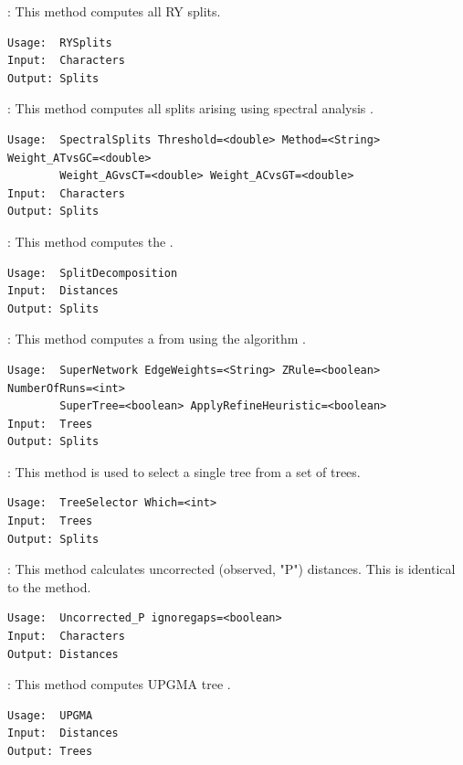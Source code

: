 \documentclass[11pt]{article}
\begin{document}
{}:
This method computes all RY splits.
\begin{verbatim}
Usage:  RYSplits
Input:  Characters
Output: Splits
\end{verbatim}

{}:
This method computes all splits arising using spectral analysis
\cite{HendyPenny93}.
\begin{verbatim}
Usage:  SpectralSplits Threshold=<double> Method=<String> Weight_ATvsGC=<double>
        Weight_AGvsCT=<double> Weight_ACvsGT=<double>
Input:  Characters
Output: Splits
\end{verbatim}

{}:
This method computes the  \cite{BandeltDress92}.
\begin{verbatim}
Usage:  SplitDecomposition
Input:  Distances
Output: Splits
\end{verbatim}

{}:
This method computes a  from  using the
 algorithm \cite{zclosure}.
\begin{verbatim}
Usage:  SuperNetwork EdgeWeights=<String> ZRule=<boolean> NumberOfRuns=<int>
        SuperTree=<boolean> ApplyRefineHeuristic=<boolean>
Input:  Trees
Output: Splits
\end{verbatim}



{}:
This method is used to select a single tree from a set of trees.
\begin{verbatim}
Usage:  TreeSelector Which=<int>
Input:  Trees
Output: Splits
\end{verbatim}

{}:
This method calculates uncorrected (observed, "P") distances.
This is identical to the  method.
\begin{verbatim}
Usage:  Uncorrected_P ignoregaps=<boolean>
Input:  Characters
Output: Distances
\end{verbatim}


{}:
This method computes UPGMA tree \cite{upgma_sokal1958}.
\begin{verbatim}
Usage:  UPGMA
Input:  Distances
Output: Trees
\end{verbatim}
\end{document}
